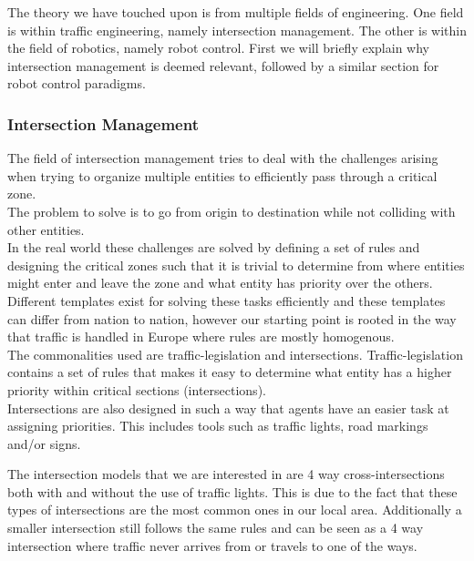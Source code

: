 The theory we have touched upon is from multiple fields of engineering. One field is within traffic engineering, namely intersection management. The other is within the field of robotics, namely robot control.
First we will briefly explain why intersection management is deemed relevant, followed by a similar section for robot control paradigms.

\subsubsection{Intersection Management}
The field of intersection management tries to deal with the challenges arising when trying to organize multiple entities to efficiently pass through a critical zone.\\
The problem to solve is to go from origin to destination while not colliding with other entities.\\

In the real world these challenges are solved by defining a set of rules and designing the critical zones such that it is trivial to determine from where entities might enter and leave the zone and what entity has priority over the others.\\

Different templates exist for solving these tasks efficiently and these templates can differ from nation to nation, however our starting point is rooted in the way that traffic is handled in Europe where rules are mostly homogenous.\\

The commonalities used are traffic-legislation and intersections.
Traffic-legislation contains a set of rules that makes it easy to determine what entity has a higher priority within critical sections (intersections).\\
Intersections are also designed in such a way that agents have an easier task at assigning priorities. 
This includes tools such as traffic lights, road markings and/or signs.

The intersection models that we are interested in are 4 way cross-intersections both with and without the use of traffic lights.
This is due to the fact that these types of intersections are the most common ones in our local area. Additionally a smaller intersection still follows the same rules and can be seen as a 4 way intersection where traffic never arrives from or travels to one of the ways.

